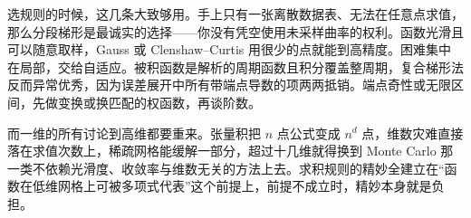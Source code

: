 选规则的时候，这几条大致够用。手上只有一张离散数据表、无法在任意点求值，那么分段梯形是最诚实的选择——你没有凭空使用未采样曲率的权利。函数光滑且可以随意取样，Gauss 或 Clenshaw--Curtis 用很少的点就能到高精度。困难集中在局部，交给自适应。被积函数是解析的周期函数且积分覆盖整周期，复合梯形法反而异常优秀，因为误差展开中所有带端点导数的项两两抵销。端点奇性或无限区间，先做变换或换匹配的权函数，再谈阶数。

而一维的所有讨论到高维都要重来。张量积把 \(n\) 点公式变成 \(n^d\) 点，维数灾难直接落在求值次数上，稀疏网格能缓解一部分，超过十几维就得换到 Monte Carlo 那一类不依赖光滑度、收敛率与维数无关的方法上去。求积规则的精妙全建立在``函数在低维网格上可被多项式代表''这个前提上，前提不成立时，精妙本身就是负担。

